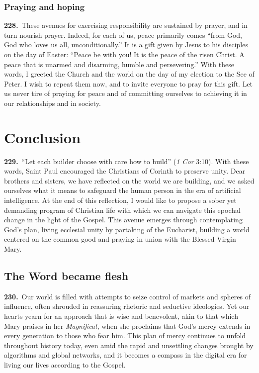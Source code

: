 \documentclass{article}
\begin{document}
\subsubsection{Praying and hoping}

\textbf{228.}\ These avenues for exercising responsibility are sustained by prayer, and in turn nourish prayer. Indeed, for each of us, peace primarily comes ``from God, God who loves us all, unconditionally.''\cite{n203} It is a gift given by Jesus to his disciples on the day of Easter: ``Peace be with you! It is the peace of the risen Christ. A peace that is unarmed and disarming, humble and persevering.''\cite{n204} With these words, I greeted the Church and the world on the day of my election to the See of Peter. I wish to repeat them now, and to invite everyone to pray for this gift. Let us never tire of praying for peace and of committing ourselves to achieving it in our relationships and in society.

\section{Conclusion}

\textbf{229.}\ ``Let each builder choose with care how to build'' (\emph{1 Cor} 3:10). With these words, Saint Paul encouraged the Christians of Corinth to preserve unity. Dear brothers and sisters, we have reflected on the world we are building, and we asked ourselves what it means to safeguard the human person in the era of artificial intelligence. At the end of this reflection, I would like to propose a sober yet demanding program of Christian life with which we can navigate this epochal change in the light of the Gospel. This avenue emerges through contemplating God's plan, living ecclesial unity by partaking of the Eucharist, building a world centered on the common good and praying in union with the Blessed Virgin Mary.

\subsection{The Word became flesh}

\textbf{230.}\ Our world is filled with attempts to seize control of markets and spheres of influence, often shrouded in reassuring rhetoric and seductive ideologies. Yet our hearts yearn for an approach that is wise and benevolent, akin to that which Mary praises in her \emph{Magnificat}, when she proclaims that God's mercy extends in every generation to those who fear him.\cite{n205} This plan of mercy continues to unfold throughout history today, even amid the rapid and unsettling changes brought by algorithms and global networks, and it becomes a compass in the digital era for living our lives according to the Gospel.
\end{document}
